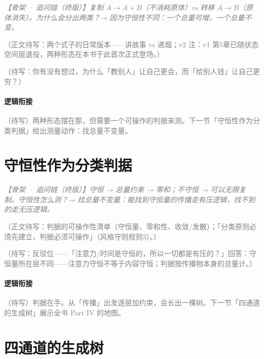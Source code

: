 \documentclass[../../main2.tex]{subfiles}
\begin{document}
	\textcolor{gray}{\textit{【骨架 · 追问链（终版）】复制 $A \to A + B$（不消耗原体）vs 转移 $A \to B$（原体消失）。为什么会分出两类？→ 因为守恒性不同：一个总量可增，一个总量不变。}}

	\textcolor{gray}{（正文待写：两个式子的日常版本——讲故事 vs 递烟；v2 注：v1 第5章已随状态空间层退役，两种形态在本书于此首次正式登场。）}

	\begin{readingnote}
		\textcolor{gray}{（待写：你有没有想过，为什么「教别人」让自己更会，而「给别人钱」让自己更穷？）}
	\end{readingnote}

	\paragraph*{逻辑衔接}
	\textcolor{gray}{（待写）两种形态摆在那，但需要一个可操作的判据来测。下一节「守恒性作为分类判据」给出测量动作：找总量不变量。}

	\section{守恒性作为分类判据}
	\label{sec:gen-conservation}

	\textcolor{gray}{\textit{【骨架 · 追问链（终版）】守恒 → 总量约束 → 零和；不守恒 → 可以无限复制。守恒性怎么测？→ 找总量不变量：能找到守恒量的传播走有压逻辑，找不到的走无压逻辑。}}

	\textcolor{gray}{（正文待写：判据的可操作性清单（守恒量、零和性、收敛/发散）；「分类原则必须先建立，判据必须可操作」（风格守则规则3）。）}

	\begin{questionbox}
		\textcolor{gray}{（待写：反驳位——「注意力/时间是守恒的，所以一切都是有压的？」回答：守恒量所在层不同——注意力守恒不等于内容守恒；判据按传播物本身的总量计。）}
	\end{questionbox}

	\paragraph*{逻辑衔接}
	\textcolor{gray}{（待写）判据在手。从「传播」出发逐层加约束，会长出一棵树。下一节「四通道的生成树」展示全书 Part IV 的地图。}

	\section{四通道的生成树}
	\label{sec:gen-tree}
\end{document}
